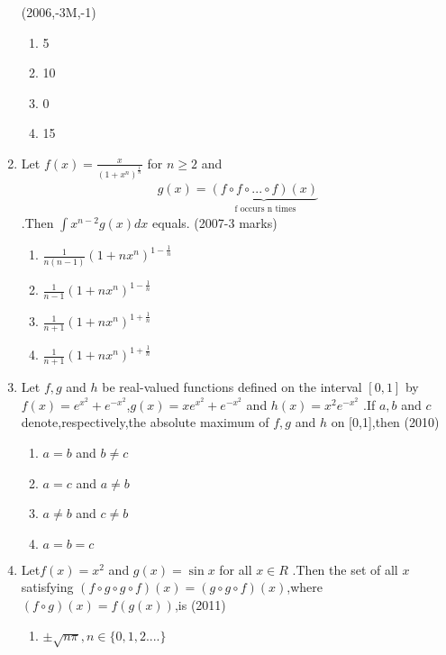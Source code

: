 \documentclass[journal,12pt,twocolumn]{IEEEtran}
\theoremstyle{remark}
\begin{document}
\begin{enumerate}
\hfill(2006,-3M,-1)
\begin{multicols}{2}
\begin{enumerate}
    \item 5
    \item 10
    \item 0
    \item 15
\end{enumerate}
\end{multicols}
\item Let $f(x)=\frac{x}{(1+x^n)^\frac{1}{n}}$ for $ n\geq2$ and \begin{align*}g(x)= \underbrace{(f\circ f\circ...\circ f)(x)}_{\text{ f occurs n times}}\end{align*}.Then $\int x^{n-2} g(x)dx$ equals.
\hfill(2007-3 marks)\\
\begin{multicols}{2}
\begin{enumerate}
    \item$ \frac{1}{n(n-1)} (1+nx^n)^{1-\frac{1}{n}} $
    \item$ \frac{1}{n-1} (1+nx^n)^{1-\frac{1}{n}} $
    \item$ \frac{1}{n+1} (1+nx^n)^{1+\frac{1}{n}} $
    \item$ \frac{1}{n+1} (1+nx^n)^{1+\frac{1}{n}} $
\end{enumerate}
\end{multicols}
\item Let $f,g$ and $h$ be real-valued functions defined on the interval $[0,1]$ by $f(x)= e^{x^2} + e^{-x^2}$,$g(x)=xe^{x^2}+ e^{-x^2}$ and $h(x)=x^2e^{-x^2}$ .If $a,b$ and $c$ denote,respectively,the absolute maximum of $f,g$ and $h$ on [0,1],then 
\hfill(2010)
\begin{multicols}{2}
\begin{enumerate}
    \item $a=b$ and $b\neq c$
    \item $a=c$ and $a\neq b$
    \item $a\neq b$ and $c \neq b$
    \item $a=b=c$
\end{enumerate}
\end{multicols}
\item Let$f(x)=x^2$ and $g(x)=\sin x$ for all $x\in R$ .Then the set of all $x$ satisfying $(f\circ g\circ g\circ f)(x)=(g\circ g\circ f)(x)$,where $(f\circ g)(x)=f(g(x))$,is
\hfill(2011)
\begin{enumerate}
    \item $ \pm \sqrt{n\pi},n\in \{0,1,2....\}$

\end{enumerate}
\end{enumerate}
\end{document}
